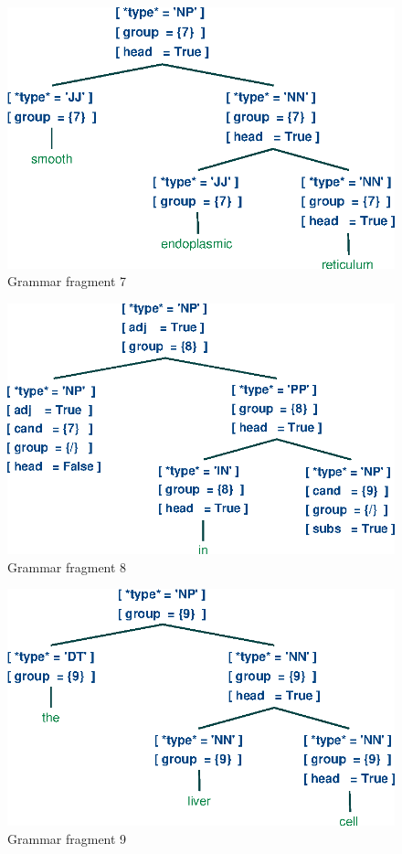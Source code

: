 \documentclass[a4paper]{article}
\begin{document}
\begin{figure}[h]
    \begin{center}
        \includegraphics[scale=0.5]{7.eps}
    \end{center}
    \caption{Grammar fragment 7}
\end{figure}
\begin{figure}[h]
    \begin{center}
        \includegraphics[scale=0.5]{8.eps}
    \end{center}
    \caption{Grammar fragment 8}
\end{figure}
\begin{figure}[h]
    \begin{center}
        \includegraphics[scale=0.5]{9.eps}
    \end{center}
    \caption{Grammar fragment 9}
\end{figure}
\end{document}
